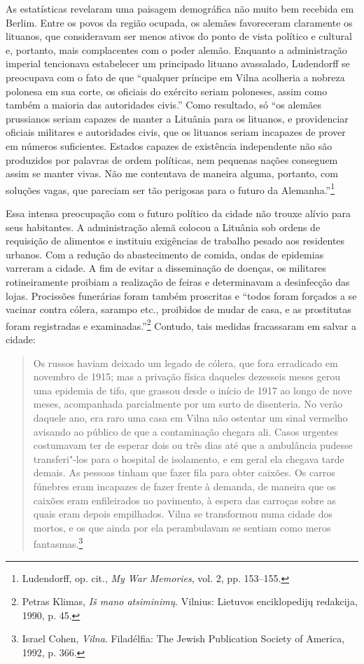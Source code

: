 As estatísticas revelaram uma paisagem demográfica não muito bem
recebida em Berlim. Entre os povos da região ocupada, os alemães
favoreceram claramente os lituanos, que consideravam ser menos ativos do
ponto de vista político e cultural e, portanto, mais complacentes com o
poder alemão. Enquanto a administração imperial tencionava estabelecer
um principado lituano avassalado, Ludendorff se preocupava com o fato de
que ``qualquer príncipe em Vilna acolheria a nobreza polonesa em sua
corte, os oficiais do exército seriam poloneses, assim como também a
maioria das autoridades civis.'' Como resultado, só ``os alemães
prussianos seriam capazes de manter a Lituânia para os lituanos, e
providenciar oficiais militares e autoridades civis, que os lituanos
seriam incapazes de prover em números suficientes. Estados capazes de
existência independente não são produzidos por palavras de ordem
políticas, nem pequenas nações conseguem assim se manter vivas. Não me
contentava de maneira alguma, portanto, com soluções vagas, que pareciam
ser tão perigosas para o futuro da Alemanha.''\footnote{Ludendorff, op. cit., \textit{My War Memories}, vol. 2, pp. 153--155.}

Essa intensa preocupação com o futuro político da cidade não trouxe
alívio para seus habitantes. A administração alemã colocou a Lituânia
sob ordens de requisição de alimentos e instituiu exigências de trabalho
pesado aos residentes urbanos. Com a redução do abastecimento de comida,
ondas de epidemias varreram a cidade. A fim de evitar a disseminação de
doenças, os militares rotineiramente proibiam a realização de feiras e
determinavam a desinfecção das lojas. Procissões funerárias foram também
proscritas e ``todos foram forçados a se vacinar contra cólera, sarampo
etc., proibidos de mudar de casa, e as prostitutas foram registradas e
examinadas.''\footnote{Petras Klimas, \textit{Iš mano atsiminimų}. Vilnius: Lietuvos enciklopedijų redakcija, 1990, p. 45.} Contudo, tais medidas fracassaram em salvar a cidade:

\begin{quote}
Os russos haviam deixado um legado de cólera, que fora erradicado em
novembro de 1915; mas a privação física daqueles dezesseis meses gerou
uma epidemia de tifo, que grassou desde o início de 1917 ao longo de
nove meses, acompanhada parcialmente por um surto de disenteria. No
verão daquele ano, era raro uma casa em Vilna não ostentar um sinal
vermelho avisando ao público de que a contaminação chegara ali. Casos
urgentes costumavam ter de esperar dois ou três dias até que a
ambulância pudesse transferi"-los para o hospital de isolamento, e em
geral ela chegava tarde demais. As pessoas tinham que fazer fila para
obter caixões. Os carros fúnebres eram incapazes de fazer frente à
demanda, de maneira que os caixões eram enfileirados no pavimento, à
espera das carroças sobre as quais eram depois empilhados. Vilna se
transformou numa cidade dos mortos, e os que ainda por ela perambulavam
se sentiam como meros fantasmas.\footnote{Israel Cohen, \textit{Vilna}. Filadélfia: The Jewish Publication Society of America, 1992, p. 366.} 
\end{quote}

